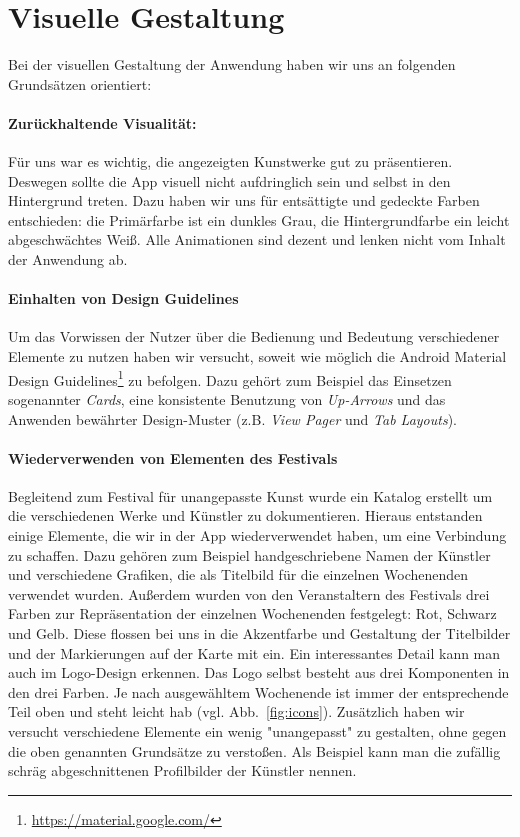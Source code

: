 \section{Visuelle Gestaltung}
\label{sec:visual}
Bei der visuellen Gestaltung der Anwendung haben wir uns an folgenden Grundsätzen orientiert:
\paragraph{Zurückhaltende Visualität:}Für uns war es wichtig, die angezeigten Kunstwerke gut zu präsentieren. Deswegen sollte die App visuell nicht aufdringlich sein und selbst in den Hintergrund treten. Dazu haben wir uns für entsättigte und gedeckte Farben entschieden: die Primärfarbe ist ein dunkles Grau, die Hintergrundfarbe ein leicht abgeschwächtes Weiß. Alle Animationen sind dezent und lenken nicht vom Inhalt der Anwendung ab.
\paragraph{Einhalten von Design Guidelines} Um das Vorwissen der Nutzer über die Bedienung und Bedeutung verschiedener Elemente zu nutzen haben wir versucht, soweit wie möglich die Android Material Design Guidelines\footnote{\url{https://material.google.com/}} zu befolgen. Dazu gehört zum Beispiel das Einsetzen sogenannter \textit{Cards}, eine konsistente Benutzung von \textit{Up-Arrows} und das Anwenden bewährter Design-Muster (z.B. \textit{View Pager} und \textit{Tab Layouts}).
\paragraph{Wiederverwenden von Elementen des Festivals} Begleitend zum Festival für unangepasste Kunst wurde ein Katalog erstellt um die verschiedenen Werke und Künstler zu dokumentieren. Hieraus entstanden einige Elemente, die wir in der App wiederverwendet haben, um eine Verbindung zu schaffen. Dazu gehören zum Beispiel handgeschriebene Namen der Künstler und verschiedene Grafiken, die als Titelbild für die einzelnen Wochenenden verwendet wurden. Außerdem wurden von den Veranstaltern des Festivals drei Farben zur Repräsentation der einzelnen Wochenenden festgelegt: Rot, Schwarz und Gelb. Diese flossen bei uns in die Akzentfarbe und Gestaltung der Titelbilder und der Markierungen auf der Karte mit ein. Ein interessantes Detail kann man auch im Logo-Design erkennen. Das Logo selbst besteht aus drei Komponenten in den drei Farben. Je nach ausgewähltem Wochenende ist immer der entsprechende Teil oben und steht leicht hab (vgl. Abb.~\ref{fig:icons}).
Zusätzlich haben wir versucht verschiedene Elemente ein wenig "unangepasst" zu gestalten, ohne gegen die oben genannten Grundsätze zu verstoßen. Als Beispiel kann man die zufällig schräg abgeschnittenen Profilbilder der Künstler nennen.

